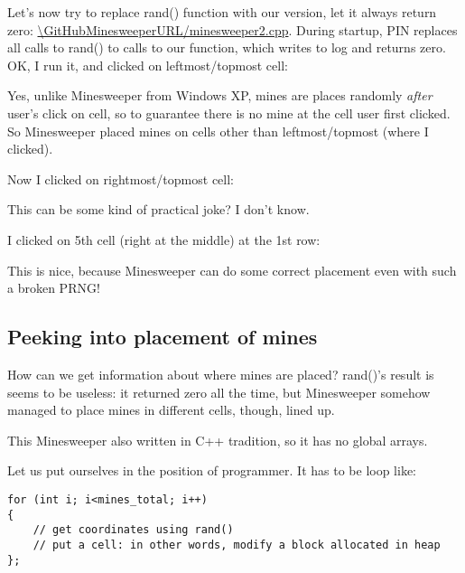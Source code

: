 Let's now try to replace rand() function with our version, let it always return zero: \url{\GitHubMinesweeperURL/minesweeper2.cpp}.
During startup, PIN replaces all calls to rand() to calls to our function, which writes to log and returns zero.
OK, I run it, and clicked on leftmost/topmost cell:

\begin{figure}[H]
\centering
{}
\end{figure}

Yes, unlike Minesweeper from Windows XP, mines are places randomly \emph{after} user's click on cell, so to guarantee
there is no mine at the cell user first clicked.
So Minesweeper placed mines on cells other than leftmost/topmost (where I clicked).

Now I clicked on rightmost/topmost cell:

\begin{figure}[H]
\centering
{}
\end{figure}

This can be some kind of practical joke? I don't know.

I clicked on 5th cell (right at the middle) at the 1st row:

\begin{figure}[H]
\centering
{}
\end{figure}

This is nice, because Minesweeper can do some correct placement even with such a broken \ac{PRNG}!

\subsection{Peeking into placement of mines}

How can we get information about where mines are placed?
rand()'s result is seems to be useless: it returned zero all the time, but Minesweeper somehow managed to place
mines in different cells, though, lined up.

This Minesweeper also written in C++ tradition, so it has no global arrays.

Let us put ourselves in the position of programmer.
It has to be loop like:

\begin{lstlisting}
for (int i; i<mines_total; i++)
{
	// get coordinates using rand()
	// put a cell: in other words, modify a block allocated in heap
};
\end{lstlisting}

